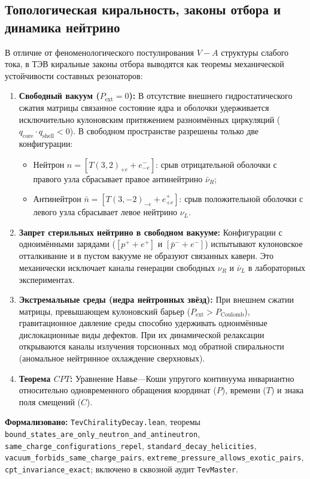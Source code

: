 \documentclass[11pt,a4paper]{article}
\theoremstyle{definition}
\theoremstyle{remark}
\begin{document}
\subsection{Топологическая киральность, законы отбора и динамика нейтрино}
\label{subsec:chirality_selection_rules}

В отличие от феноменологического постулирования $V - A$ структуры слабого тока, в ТЭВ киральные законы отбора выводятся как теоремы механической устойчивости составных резонаторов:

\begin{enumerate}
\item \textbf{Свободный вакуум ($P_{\mathrm{ext}} = 0$):} В отсутствие внешнего гидростатического сжатия матрицы связанное состояние ядра и оболочки удерживается исключительно кулоновским притяжением разноимённых циркуляций ($q_{\mathrm{core}} \cdot q_{\mathrm{shell}} < 0$). В свободном пространстве разрешены только две конфигурации:
\begin{itemize}
\item Нейтрон $n = [T(3,2)_{+e} + e^-_{-e}]$: срыв отрицательной оболочки с правого узла сбрасывает правое антинейтрино $\bar{\nu}_R$;
\item Антинейтрон $\bar{n} = [T(3,-2)_{-e} + e^+_{+e}]$: срыв положительной оболочки с левого узла сбрасывает левое нейтрино $\nu_L$.
\end{itemize}
\item \textbf{Запрет стерильных нейтрино в свободном вакууме:} Конфигурации с одноимёнными зарядами ($[p^+ + e^+]$ и $[\bar{p}^- + e^-]$) испытывают кулоновское отталкивание и в пустом вакууме не образуют связанных каверн. Это механически исключает каналы генерации свободных $\nu_R$ и $\bar{\nu}_L$ в лабораторных экспериментах.
\item \textbf{Экстремальные среды (недра нейтронных звёзд):} При внешнем сжатии матрицы, превышающем кулоновский барьер ($P_{\mathrm{ext}} > P_{\mathrm{Coulomb}}$), гравитационное давление среды способно удерживать одноимённые дислокационные виды дефектов. При их динамической релаксации открываются каналы излучения торсионных мод обратной спиральности (аномальное нейтринное охлаждение сверхновых).
\item \textbf{Теорема $CPT$:} Уравнение Навье---Коши упругого континуума инвариантно относительно одновременного обращения координат ($P$), времени ($T$) и знака поля смещений ($C$).
\end{enumerate}

\noindent\small\textbf{Формализовано:} \texttt{TevChiralityDecay.lean}, теоремы \texttt{bound\_states\_are\_only\_neutron\_and\_antineutron}, \texttt{same\_charge\_configurations\_repel}, \texttt{standard\_decay\_helicities}, \texttt{vacuum\_forbids\_same\_charge\_pairs}, \texttt{extreme\_pressure\_allows\_exotic\_pairs}, \texttt{cpt\_invariance\_exact}; включено в сквозной аудит \texttt{TevMaster}.
\end{document}
